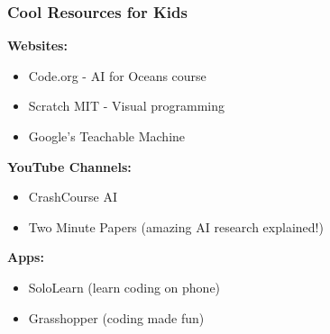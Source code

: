 \begin{frame}[fragile]\frametitle{Cool Resources for Kids}

{\bf Websites:}
\begin{itemize}
\item Code.org - AI for Oceans course
\item Scratch MIT - Visual programming
\item Google's Teachable Machine
\end{itemize}

{\bf YouTube Channels:}
\begin{itemize}
\item CrashCourse AI
\item Two Minute Papers (amazing AI research explained!)
\end{itemize}

{\bf Apps:}
\begin{itemize}
\item SoloLearn (learn coding on phone)
\item Grasshopper (coding made fun)
\end{itemize}
\end{frame}
